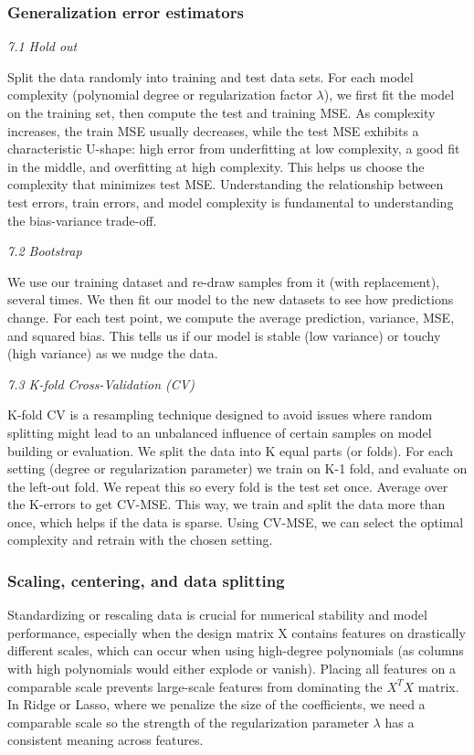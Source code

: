 \documentclass[amssymb,twocolumn,aps]{revtex4-2}
\begin{document}
\subsubsection{Generalization error estimators}
\label{subsubsec:error_theory}

\textit{7.1 Hold out}

Split the data randomly into training and test data sets. For each model complexity (polynomial degree or regularization factor $\lambda$), we first fit the model on the training set, then compute the test and training MSE. As complexity increases, the train MSE usually decreases, while the test MSE exhibits a characteristic U-shape: high error from underfitting at low complexity, a good fit in the middle, and overfitting at high complexity. This helps us choose the complexity that minimizes test MSE. Understanding the relationship between test errors, train errors, and model complexity is fundamental to understanding the bias-variance trade-off. 

\textit{7.2 Bootstrap}

We use our training dataset and re-draw samples from it (with replacement), several times. We then fit our model to the new datasets to see how predictions change. For each test point, we compute the average prediction, variance, MSE, and squared bias. This tells us if our model is stable (low variance) or touchy (high variance) as we nudge the data. 

\textit{7.3 K-fold Cross-Validation (CV)}

K-fold CV is a resampling technique designed to avoid issues where random splitting might lead to an unbalanced influence of certain samples on model building or evaluation. We split the data into K equal parts (or folds). For each setting (degree or regularization parameter) we train on K-1 fold, and evaluate on the left-out fold. We repeat this so every fold is the test set once. Average over the K-errors to get CV-MSE. This way, we train and split the data more than once, which helps if the data is sparse. Using CV-MSE, we can select the optimal complexity and retrain with the chosen setting.  

\subsubsection{Scaling, centering, and data splitting}
\label{subsubsec:scal_theory}

Standardizing or rescaling data is crucial for numerical stability and model performance, especially when the design matrix X contains features on drastically different scales, which can occur when using high-degree polynomials (as columns with high polynomials would either explode or vanish). Placing all features on a comparable scale prevents large-scale features from dominating the $X^TX$ matrix. In Ridge or Lasso, where we penalize the size of the coefficients, we need a comparable scale so the strength of the regularization parameter $\lambda$ has a consistent meaning across features. \\
\end{document}
